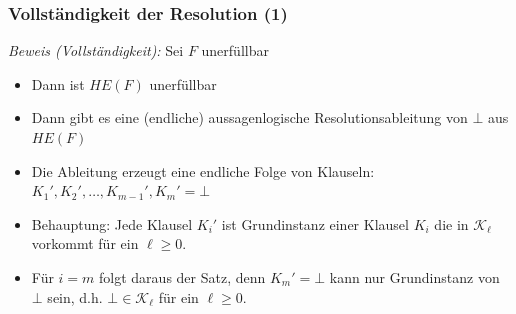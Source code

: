 \documentclass[onlymath]{beamer}
\begin{document}
\begin{frame}[t]\frametitle{Vollständigkeit der Resolution (1)}

\pause

\emph{Beweis (Vollständigkeit):} Sei $F$ unerfüllbar
\begin{itemize}
\item Dann ist $HE(F)$ unerfüllbar
\item Dann gibt es eine (endliche) aussagenlogische Resolutionsableitung von $\bot$ aus $HE(F)$
\item Die Ableitung erzeugt eine endliche Folge von Klauseln: $K_1',K_2',\ldots,K_{m-1}',K_m'=\bot$
\item \alert{Behauptung:} Jede Klausel $K_i'$ ist Grundinstanz einer Klausel $K_i$ die in $\mathcal{K}_\ell$ vorkommt für ein $\ell\geq 0$.
\item Für $i=m$ folgt daraus der Satz, denn $K_m'=\bot$ kann nur Grundinstanz von $\bot$ sein, d.h. $\bot\in\mathcal{K}_\ell$ für ein $\ell\geq 0$.
\end{itemize}

\end{frame}
\end{document}

